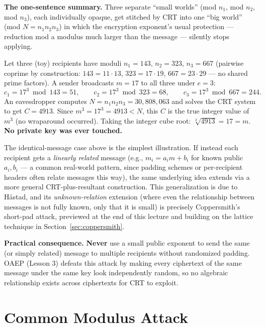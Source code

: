 \medskip\noindent\textbf{The one-sentence summary.} Three separate ``small worlds'' (mod $n_1$, mod $n_2$, mod $n_3$), each individually opaque, get stitched by CRT into one ``big world'' (mod $N=n_1n_2n_3$) in which the encryption exponent's usual protection — reduction mod a modulus much larger than the message — silently stops applying.

\begin{example}[Håstad's attack, $e=3$, fully worked]
Let three (toy) recipients have moduli $n_1 = 143$, $n_2 = 323$, $n_3 = 667$ (pairwise coprime by construction: $143=11\cdot13$, $323=17\cdot19$, $667=23\cdot29$ — no shared prime factors). A sender broadcasts $m=17$ to all three under $e=3$:
\[
c_1 = 17^3 \bmod 143 = 51, \qquad c_2 = 17^3 \bmod 323 = 68, \qquad c_3 = 17^3 \bmod 667 = 244.
\]
An eavesdropper computes $N = n_1n_2n_3 = 30{,}808{,}063$ and solves the CRT system to get $C = 4913$. Since $m^3 = 17^3 = 4913 < N$, this $C$ is the true integer value of $m^3$ (no wraparound occurred). Taking the integer cube root: $\sqrt[3]{4913} = 17 = m$. \textbf{No private key was ever touched.}
\end{example}

\begin{remark}
The identical-message case above is the simplest illustration. If instead each recipient gets a \emph{linearly related} message (e.g., $m_i = a_i m + b_i$ for known public $a_i,b_i$ — a common real-world pattern, since padding schemes or per-recipient headers often relate messages this way), the same underlying idea extends via a more general CRT-plus-resultant construction. This generalization is due to Håstad, and its \emph{unknown-relation} extension (where even the relationship between messages is not fully known, only that it is small) is precisely Coppersmith's short-pad attack, previewed at the end of this lecture and building on the lattice technique in Section~\ref{sec:coppersmith}.
\end{remark}

\medskip\noindent\textbf{Practical consequence.} \textbf{Never} use a small public exponent to send the same (or simply related) message to multiple recipients without randomized padding. OAEP (Lesson 3) defeats this attack by making every ciphertext of the same message under the same key look independently random, so no algebraic relationship exists across ciphertexts for CRT to exploit.

\newpage
\section{Common Modulus Attack}

